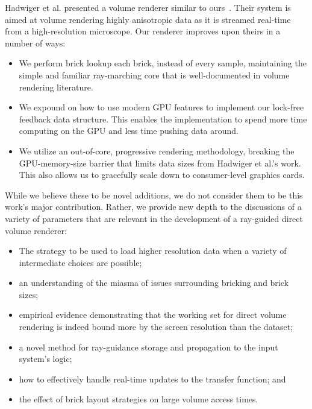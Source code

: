 Hadwiger et al. presented a volume renderer similar to
ours~\cite{Hadwiger:2012:Guided}.  Their system is aimed at volume
rendering highly anisotropic data as it is streamed real-time from a
high-resolution microscope.  Our renderer improves upon theirs in a
number of ways:

\begin{itemize}
  \itemsep0em
  \item We perform brick lookup each brick, instead of every sample,
  maintaining the simple and familiar ray-marching core that is
  well-documented in volume rendering literature.

  \item We expound on how to use modern GPU features to implement our
  lock-free feedback data structure.  This enables the implementation
  to spend more time computing on the GPU and less time pushing data
  around.

  \item We utilize an out-of-core, progressive rendering methodology,
  breaking the GPU-memory-size barrier that limits data sizes from
  Hadwiger et al.'s work.  This also allows us to gracefully scale down
  to consumer-level graphics cards.
\end{itemize}

While we believe these to be novel additions, we do not consider them
to be this work's major contribution.  Rather, we provide new depth to
the discussions of a variety of parameters that are relevant in the
development of a ray-guided direct volume renderer:

\begin{itemize}
  \itemsep0em
  \item The strategy to be used to load higher resolution data when a
  variety of intermediate choices are possible;

  \item an understanding of the miasma of issues surrounding bricking
  and brick sizes;

  \item empirical evidence demonstrating that the working set for
  direct volume rendering is indeed bound more by the screen resolution
  than the dataset;

  \item a novel method for ray-guidance storage and propagation to the
  input system's logic;

  \item how to effectively handle real-time updates to the transfer
  function; and

  \item the effect of brick layout strategies on large volume access
  times.

\end{itemize}

